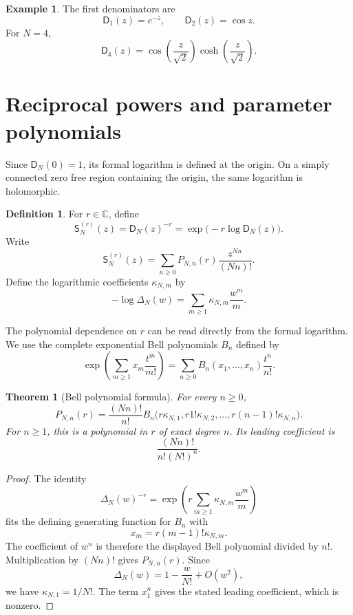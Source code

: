 \documentclass{aomart}
\newtheorem{theorem}{Theorem}[section]
\theoremstyle{definition}
\newtheorem{definition}[definition]{Definition}
\newtheorem{example}[example]{Example}
\theoremstyle{remark}
\newcommand{\CC}{\mathbb C}
\newcommand{\Dfun}{\mathsf D}
\newcommand{\Sfun}{\mathsf S}
\begin{document}
\begin{example}\label{ex:small_denominators}
The first denominators are
\[
\Dfun_1(z)=e^{-z},
\qquad
\Dfun_2(z)=\cos z.
\]
For $N=4$,
\[
\Dfun_4(z)
=
\cos\left(\frac z{\sqrt2}\right)
\cosh\left(\frac z{\sqrt2}\right).
\]
\end{example}

\section{Reciprocal powers and parameter polynomials}\label{sec:reciprocal_powers}

Since $\Dfun_N(0)=1$, its formal logarithm is defined at the origin.  On a simply connected zero free region containing the origin, the same logarithm is holomorphic.

\begin{definition}\label{def:reciprocal_family}
For $r\in\CC$, define
\[
\Sfun_N^{(r)}(z)
=
\Dfun_N(z)^{-r}
=
\exp\bigl(-r\log\Dfun_N(z)\bigr).
\]
Write
\[
\Sfun_N^{(r)}(z)
=
\sum_{n\geq0}P_{N,n}(r)\frac{z^{Nn}}{(Nn)!}.
\]
Define the logarithmic coefficients $\kappa_{N,m}$ by
\[
-\log\Delta_N(w)
=
\sum_{m\geq1}\kappa_{N,m}\frac{w^m}{m}.
\]
\end{definition}

The polynomial dependence on $r$ can be read directly from the formal logarithm.  We use the complete exponential Bell polynomials $B_n$ defined by
\[
\exp\left(\sum_{m\geq1}x_m\frac{t^m}{m!}\right)
=
\sum_{n\geq0}B_n(x_1,\ldots,x_n)\frac{t^n}{n!}.
\]

\begin{theorem}[Bell polynomial formula]\label{thm:reciprocal_bell}
For every $n\geq0$,
\[
P_{N,n}(r)
=
\frac{(Nn)!}{n!}
B_n\bigl(
 r\kappa_{N,1},
 r1!\kappa_{N,2},
 \ldots,
 r(n-1)!\kappa_{N,n}
\bigr).
\]
For $n\geq1$, this is a polynomial in $r$ of exact degree $n$.  Its leading coefficient is
\[
\frac{(Nn)!}{n!(N!)^n}.
\]
\end{theorem}

\begin{proof}
The identity
\[
\Delta_N(w)^{-r}
=
\exp\left(
 r\sum_{m\geq1}\kappa_{N,m}\frac{w^m}{m}
\right)
\]
fits the defining generating function for $B_n$ with
\[
x_m=r(m-1)!\kappa_{N,m}.
\]
The coefficient of $w^n$ is therefore the displayed Bell polynomial divided by $n!$.  Multiplication by $(Nn)!$ gives $P_{N,n}(r)$.  Since
\[
\Delta_N(w)=1-\frac{w}{N!}+O(w^2),
\]
we have $\kappa_{N,1}=1/N!$.  The term $x_1^n$ gives the stated leading coefficient, which is nonzero.
\end{proof}
\end{document}
